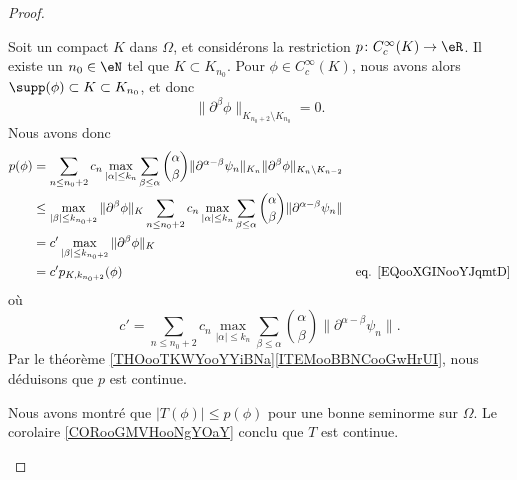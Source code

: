 \begin{proof}
\begin{subproof}
		Soit un compact \( K\) dans \( \Omega\), et considérons la restriction \(p \colon C_c^{\infty}(K)\to \eR  \). Il existe un \( n_0\in \eN\) tel que \( K\subset K_{n_0}\). Pour \( \phi\in C_c^{\infty}(K)\), nous avons alors \( \supp(\phi)\subset K\subset K_{n_0}\), et donc
		\begin{equation}
			\| \partial^{\beta}\phi \|_{K_{n_0+2}\setminus K_{n_0}}=0.
		\end{equation}
		Nous avons donc
		\begin{subequations}
			\begin{align}
				p(\phi) & = \sum_{n\leq n_0+2} c_n\max_{| \alpha |\leq k_n}\sum_{\beta\leq \alpha}\binom{ \alpha }{ \beta }\| \partial^{\alpha-\beta}\psi_n \|_{K_n}\| \partial^{\beta}\phi \|_{K_n\setminus K_{n-2}}                                            \\
				        & \leq \max_{| \beta |\leq k_{n_0+2}}  \| \partial^{\beta}\phi \|_K\sum_{n\leq n_0+2}c_n\max_{| \alpha |\leq k_n}\sum_{\beta\leq \alpha}\binom{ \alpha }{\beta}\| \partial^{\alpha-\beta}\psi_n \|                                       \\
				        & = c'\max_{| \beta |\leq k_{n_0+2}}\| \partial^{\beta}\phi \|_K                                                                                                                                                                         \\
				        & = c' p_{K,k_{n_0+2}}(\phi)                                                                                                                                                                       & \text{eq. \eqref{EQooXGINooYJqmtD}}
			\end{align}
		\end{subequations}
		où
		\begin{equation}
			c'= \sum_{n\leq n_0+2}c_n\max_{| \alpha |\leq k_n}\sum_{\beta\leq \alpha}\binom{ \alpha }{\beta}\| \partial^{\alpha-\beta}\psi_n \|.
		\end{equation}
		Par le théorème \ref{THOooTKWYooYYiBNa}\ref{ITEMooBBNCooGwHrUI}, nous déduisons que \( p\) est continue.

		\spitem[Conclusion]
		Nous avons montré que \( | T(\phi) |\leq p(\phi)\) pour une bonne seminorme sur \( \Omega\). Le corolaire \ref{CORooGMVHooNgYOaY} conclu que \( T\) est continue.

	\end{subproof}
\end{proof}

